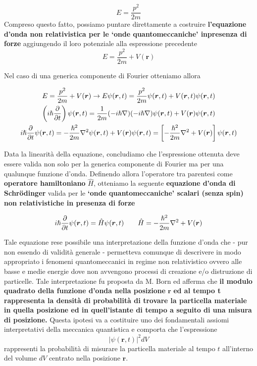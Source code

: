 \[
	E = \frac{p^2}{2m}
\]
Compreso questo fatto, possiamo puntare direttamente a costruire
\textbf{l'equazione d'onda non relativistica per le `onde
quantomeccaniche' inpresenza di forze} aggiungendo il loro potenziale
alla espressione precedente
\[
	E = \frac{p^2}{2m} + V(\bm{r})
\]

Nel caso di una generica componente di Fourier otteniamo allora

\begin{gather*}
	E = \frac{p^2}{2m} + V(\bm{r}) \rightarrow E \psi(\bm{r},t) = \frac{p^2}{2m}\psi(\bm{r},t) +
	V(\bm{r},t)\psi(\bm{r},t)\\
	\left( i \hslash \frac{\partial}{\partial t} \right)\psi(\bm{r},t) = \frac{1}{2m}(- i \hslash \nabla)(- i \hslash \nabla)\psi(\bm{r},t) + V(\bm{r})\psi(\bm{r},t)\\
	i \hslash \frac{\partial}{\partial t} \psi(\bm{r},t) = - \frac{\hslash^2}{2m}\nabla^2\psi(\bm{r},t)+
	V(\bm{r})\psi(\bm{r},t) = \left[ - \frac{\hslash^2}{2m}\nabla^2 + V(\bm{r})\right] \psi(\bm{r},t)\\
\end{gather*}

Data la linearità della equazione, concludiamo che l'espressione
ottenuta deve essere valida non solo per la generica componente di
Fourier ma per una qualunque funzione d'onda.
Definendo allora
l'operatore tra parentesi come \textbf{operatore hamiltoniano}
\(\hat{H}\), otteniamo la seguente \textbf{equazione d'onda di
Schrödinger} valida per le \textbf{`onde quantomeccaniche' scalari
	(senza spin) non relativistiche in presenza di forze}


\begin{equation}
	i \hslash \frac{\partial}{\partial t} \psi(\bm{r},t) = \hat{H}\psi(\bm{r},t) \qquad
	\hat{H} = - \frac{\hslash^2}{2m} \nabla^2 + V(\bm{r})
\end{equation}

Tale equazione rese possibile una interpretazione della funzione d'onda
che - pur non essendo di validità generale - permetteva comunque di
descrivere in modo appropriato i fenomeni quantomeccanici in regime non
relativistico ovvero alle basse e medie energie dove non avvengono
processi di creazione e/o distruzione di particelle.
Tale
interpretazione fu proposta da M. Born ed afferma che \textbf{il modulo
quadrato della funzione d'onda nella posizione} \(\bm{r}\) \textbf{ed al
tempo t rappresenta la densità di probabilità di trovare la particella
materiale in quella posizione ed in quell'istante di tempo a seguito di
una misura di posizione.} Questa ipotesi va a costituire uno dei
fondamentali assiomi interpretativi della meccanica quantistica e
comporta che l'espressione
\begin{equation}
	\left | \psi(\bm{r},t)\right |^2 dV
\end{equation}
rappresenti la probabilità di misurare la particella
materiale al tempo \(t\) all'interno del volume \(dV\) centrato nella
posizione \(\bm{r}\).


